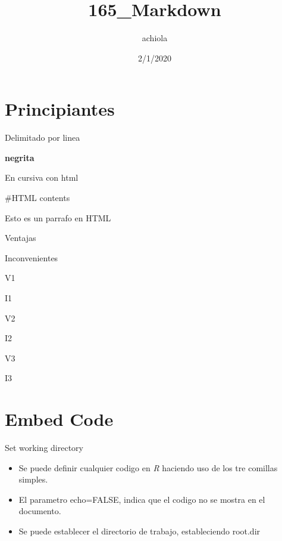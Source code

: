 \documentclass[
  ignorenonframetext,
]{beamer}
\title{165\_Markdown}
\author{achiola}
\date{2/1/2020}
\providecommand{\tightlist}{%
  \setlength{\itemsep}{0pt}\setlength{\parskip}{0pt}}
\begin{document}
\frame{\titlepage}

\hypertarget{principiantes}{%
\section{Principiantes}\label{principiantes}}

\begin{frame}

Delimitado por linea

\textbf{negrita}

En cursiva con html

\end{frame}

\begin{frame}

\#HTML contents

Esto es un parrafo en HTML

Ventajas

Inconvenientes

V1

I1

V2

I2

V3

I3

\end{frame}

\hypertarget{embed-code}{%
\section{Embed Code}\label{embed-code}}

\begin{frame}{Set working directory}
\protect\hypertarget{set-working-directory}{}

\begin{itemize}
\tightlist
\item
  Se puede definir cualquier codigo en \emph{R} haciendo uso de los tre
  comillas simples.
\item
  El parametro echo=FALSE, indica que el codigo no se mostra en el
  documento.
\item
  Se puede establecer el directorio de trabajo, estableciendo root.dir
\end{itemize}

\end{frame}
\end{document}
